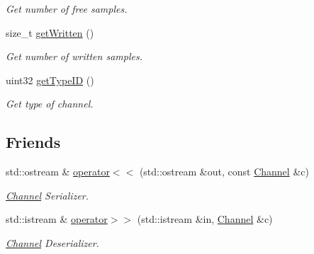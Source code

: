 \begin{DoxyCompactItemize}
\begin{DoxyCompactList}\small\item\em Get number of free samples. \item\end{DoxyCompactList}\item 
\hypertarget{classgdf_1_1_channel_a103d927127768cc75b61502415b5d892}{
size\_\-t \hyperlink{classgdf_1_1_channel_a103d927127768cc75b61502415b5d892}{getWritten} ()}
\label{classgdf_1_1_channel_a103d927127768cc75b61502415b5d892}

\begin{DoxyCompactList}\small\item\em Get number of written samples. \item\end{DoxyCompactList}\item 
\hypertarget{classgdf_1_1_channel_a2b4461c2601d75de9d8a3a818aacb821}{
uint32 \hyperlink{classgdf_1_1_channel_a2b4461c2601d75de9d8a3a818aacb821}{getTypeID} ()}
\label{classgdf_1_1_channel_a2b4461c2601d75de9d8a3a818aacb821}

\begin{DoxyCompactList}\small\item\em Get type of channel. \item\end{DoxyCompactList}\end{DoxyCompactItemize}
\subsection*{Friends}
\begin{DoxyCompactItemize}
\item 
\hypertarget{classgdf_1_1_channel_a98bbc925b3332bd24bc7964665fa586c}{
std::ostream \& \hyperlink{classgdf_1_1_channel_a98bbc925b3332bd24bc7964665fa586c}{operator$<$$<$} (std::ostream \&out, const \hyperlink{classgdf_1_1_channel}{Channel} \&c)}
\label{classgdf_1_1_channel_a98bbc925b3332bd24bc7964665fa586c}

\begin{DoxyCompactList}\small\item\em \hyperlink{classgdf_1_1_channel}{Channel} Serializer. \item\end{DoxyCompactList}\item 
\hypertarget{classgdf_1_1_channel_ad9bbbcbff8301a7d6fc3ed9636964eb6}{
std::istream \& \hyperlink{classgdf_1_1_channel_ad9bbbcbff8301a7d6fc3ed9636964eb6}{operator$>$$>$} (std::istream \&in, \hyperlink{classgdf_1_1_channel}{Channel} \&c)}
\label{classgdf_1_1_channel_ad9bbbcbff8301a7d6fc3ed9636964eb6}

\begin{DoxyCompactList}\small\item\em \hyperlink{classgdf_1_1_channel}{Channel} Deserializer. \item\end{DoxyCompactList}\end{DoxyCompactItemize}


